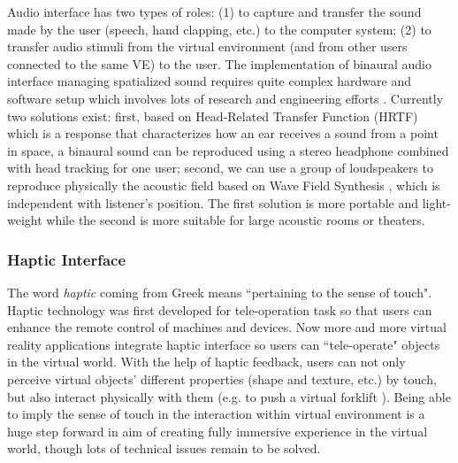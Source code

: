 Audio interface has two types of roles: (1) to capture and transfer the sound made by the user (speech, hand clapping, etc.) to the computer system; (2) to transfer audio stimuli from the virtual environment (and from other users connected to the same VE) to the user. The implementation of binaural audio interface managing spatialized sound requires quite complex hardware and software setup which involves lots of research and engineering efforts \citep{Begault1994Sound}. Currently two solutions exist: first, based on Head-Related Transfer Function (HRTF) \citep{Kistler1992HRTF} which is a response that characterizes how an ear receives a sound from a point in space, a binaural sound can be reproduced using a stereo headphone combined with head tracking for one user; second, we can use a group of loudspeakers to reproduce physically the acoustic field based on Wave Field Synthesis \citep{Verheijen1998WFS}, which is independent with listener's position. The first solution is more portable and light-weight while the second is more suitable for large acoustic rooms or theaters.


\subsubsection{Haptic Interface}
The word \textit{haptic} coming from Greek means ``pertaining to the sense of touch". Haptic technology was first developed for tele-operation task so that users can enhance the remote control of machines and devices. Now more and more virtual reality applications integrate haptic interface so users can ``tele-operate" objects in the virtual world. With the help of haptic feedback, users can not only perceive virtual objects' different properties (shape and texture, etc.) by touch, but also interact physically with them (e.g. to push a virtual forklift \citep{Martin2012Forklift}). Being able to imply the sense of touch in the interaction within virtual environment is a huge step forward in aim of creating fully immersive experience in the virtual world, though lots of technical issues remain to be solved. 

